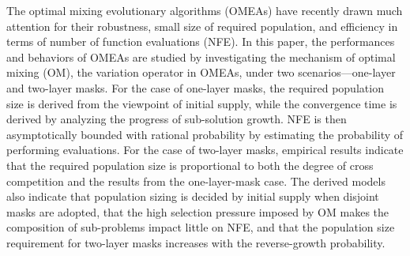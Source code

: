 The optimal mixing evolutionary algorithms (OMEAs) have recently drawn much attention for their robustness, small size of required population, and efficiency in terms of number of function evaluations (NFE).
In this paper, the performances and behaviors of OMEAs are studied by investigating the mechanism of optimal mixing (OM), the variation operator in OMEAs, under two scenarios---one-layer and two-layer masks.
For the case of one-layer masks, the required population size is derived from the viewpoint of initial supply, while the convergence time is derived by analyzing the progress of sub-solution growth.
NFE is then asymptotically bounded with rational probability by estimating the probability of performing evaluations.
For the case of two-layer masks, empirical results indicate that the required population size is proportional to both the degree of cross competition and the results from the one-layer-mask case.
The derived models also indicate that population sizing is decided by initial supply when disjoint masks are adopted,
that the high selection pressure imposed by OM makes the composition of sub-problems impact little on NFE,
and that the population size requirement for two-layer masks increases with the reverse-growth probability.
